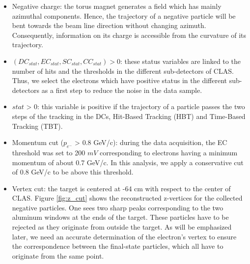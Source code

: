 \begin{itemize}
\item Negative charge: the torus magnet generates a field which has mainly azimuthal components. Hence, the trajectory of a negative particle will be bent towards the beam line direction without changing azimuth. Consequently, information on its charge is accessible from the curvature of its trajectory.           

\item $(DC_{stat}, EC_{stat}, SC_{stat}, CC_{stat}) > 0$: these status variables are linked to the number of hits and the thresholds in the different sub-detectors of CLAS. Thus, we select the electrons which have positive status in the different sub-detectors as a first step to reduce the noise in the data sample.

\item $stat$ > 0: this variable is positive if the trajectory of a particle passes the two steps of the tracking in the DCs, Hit-Based Tracking (HBT) and Time-Based Tracking (TBT).

\item Momentum cut ($p_{e^{-}}$ > 0.8 GeV/c): during the data acquisition, the 
   EC threshold was set to 200 $mV$ corresponding to electrons having a minimum 
   momentum of about 0.7 GeV/c. In this analysis, we apply a conservative cut 
   of 0.8 GeV/c to be above this threshold.

\item Vertex cut: the target is centered at -64 cm with respect to the center of CLAS. Figure \ref{fig:z_cut} shows the reconstructed z-vertices for the collected negative particles. One sees two sharp peaks corresponding to the two aluminum windows at the ends of the target. These particles have to be rejected as they originate from outside the target. As will be emphasized later, we need an accurate determination of the electron's vertex to ensure the correspondence between the final-state particles, which all have to originate from the same point.       
 

\end{itemize}
